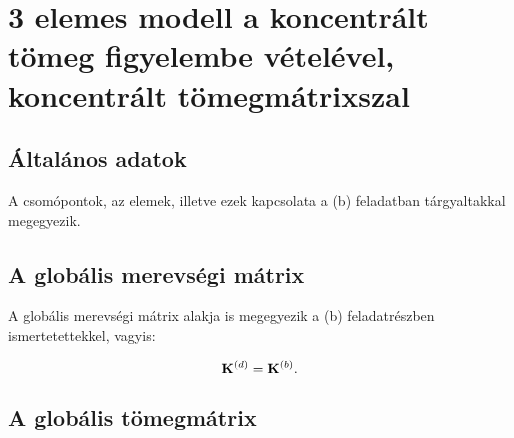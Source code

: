 \section{3 elemes modell a koncentrált tömeg figyelembe vételével, koncentrált tömegmátrixszal}

\subsection{Általános adatok}

A csomópontok, az elemek, illetve ezek kapcsolata a (b) feladatban
tárgyaltakkal megegyezik.

\subsection{A globális merevségi mátrix}

A globális merevségi mátrix alakja is megegyezik a (b) feladatrészben
ismertetettekkel, vagyis:
\begin{myframe}
  \begin{equation}
    \mathbf{K}^{(d)} = \mathbf{K}^{(b)}
    \text.
  \end{equation}
\end{myframe}

\subsection{A globális tömegmátrix}

